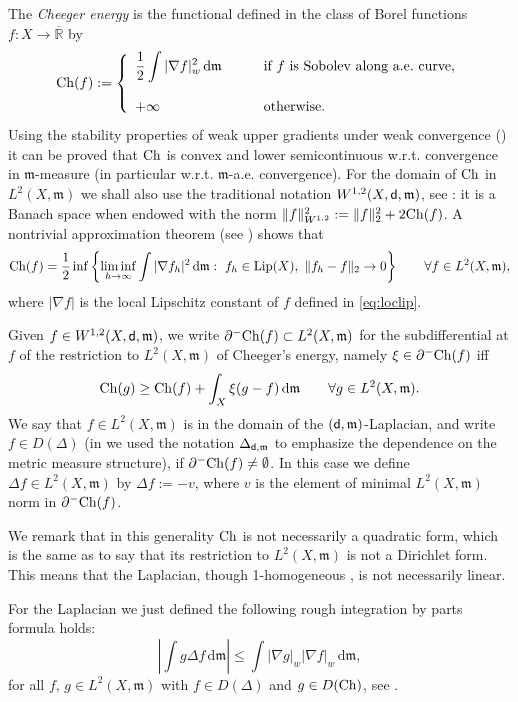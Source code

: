 \documentclass[reqno,11pt]{article}
\numberwithin{equation}{section}
\newcommand{\C}{\mathbb{C}}
\newcommand{\R}{\mathbb{R}}
\newcommand{\mm}{{\mbox{\boldmath$m$}}}
\newcommand{\sfd}{{\sf d}}
\renewcommand{\d}{{\mathrm d}}
\newcommand{\weakgrad}[1]{|\nabla #1|_w}                %
\renewcommand{\C}{{\rm Ch}}
\newcommand{\Deltam}{\Delta}
\renewcommand{\mm}{\mathfrak m}
\begin{document}
The \emph{Cheeger energy} is the functional defined in the class of
Borel functions $f:X\to\overline{\R}$ by
\[
\C(f):=\left\{
\begin{array}{ll}
\displaystyle{\frac12\int\weakgrad f^2\,\d\mm}&\qquad\text{if }f\text{ is Sobolev along a.e.~curve},\\
&\\
+\infty&\qquad\text{otherwise}.
\end{array}
\right.
\]
Using the stability properties of weak upper gradients under weak
convergence (\cite[Theorem~5.12]{Ambrosio-Gigli-Savare11}) it can be
proved that $\C$ is convex and lower semicontinuous w.r.t.
convergence in $\mm$-measure (in particular w.r.t. $\mm$-a.e.
convergence). For the domain of $\C$ in $L^2(X,\mm)$ we shall also
use the traditional notation $W^{1,2}(X,\sfd,\mm)$, see \cite[Remark
4.7]{Ambrosio-Gigli-Savare11}: it is a Banach space when endowed
with the norm $\|f\|_{W^{1,2}}^2:=\|f\|_2^2+2\C(f)$. A nontrivial
approximation theorem (see
\cite[Theorem~6.2]{Ambrosio-Gigli-Savare11}) shows that
\begin{equation}\label{eq:nontrivialatall}
\C(f)=\frac 12\inf\left\{\liminf_{h\to\infty}\int |\nabla
f_h|^2\,\d\mm:\ f_h\in {\rm Lip}(X),\,\,\|f_h-f\|_2\to
0\right\}\qquad\forall f\in L^2(X,\mm),
\end{equation}
where $|\nabla f|$ is the local Lipschitz constant of $f$ defined in
\eqref{eq:loclip}.

Given $f\in W^{1,2}(X,\sfd,\mm)$, we write $\partial^-\C(f)\subset
L^2(X,\mm)$ for the subdifferential at $f$ of the restriction to
$L^2(X,\mm)$ of Cheeger's energy, namely $\xi\in\partial^-\C(f)$ iff
$$
\C(g)\geq\C(f)+\int_X\xi(g-f)\,\d\mm\qquad\forall g\in L^2(X,\mm).
$$
We say that $f\in L^2(X,\mm)$ is in the domain of the
$(\sfd,\mm)$-Laplacian, and write $f\in D(\Deltam)$ (in
\cite{Ambrosio-Gigli-Savare11} we used the notation
$\Delta_{\sfd,\mm}$ to emphasize the dependence on the metric
measure structure), if $\partial^-\C(f)\neq\emptyset$. In this case
we define $\Deltam f\in L^2(X,\mm)$ by $\Deltam f:=-v$, where $v$ is
the element of minimal $L^2(X,\mm)$ norm in $\partial^-\C(f)$.

We remark that in this generality $\C$ is not necessarily a
quadratic form, which is the same as to say that its restriction to
$L^2(X,\mm)$ is not a Dirichlet form. This means that the Laplacian,
though 1-homogeneous \cite[Remark~4.14]{Ambrosio-Gigli-Savare11}, is
not necessarily linear.

For the Laplacian we just defined the following rough integration by
parts formula holds:
\begin{equation}
\label{eq:partilapl} \left|\int g\Deltam
f\,\d\mm\right|\leq\int\weakgrad g\weakgrad f\,\d\mm,
\end{equation}
for all $f,\,g\in L^2(X,\mm)$ with  $f\in D(\Deltam)$ and $g\in
D(\C)$, see \cite[Proposition~4.15]{Ambrosio-Gigli-Savare11}.
\end{document}
